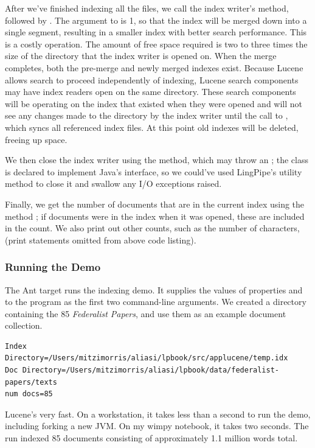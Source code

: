 After we've finished indexing all the files, we call the index
writer's  method, followed by .
The argument to  is 1, so that the index will be merged down
into a single segment, 
resulting in a smaller index with better search performance.  
This is a costly operation.
The amount of free space required is two to three times the size of
the directory that the index writer is opened on.
When the merge completes, both the pre-merge and newly merged indexes exist.
Because Lucene allows search to proceed independently of indexing,
Lucene search components may have index readers open on the same directory.
These search components will be operating on the index that existed when they were opened
and will not see any changes made to the directory by the index writer
until the call to , which syncs all referenced index files.
At this point old indexes will be deleted, freeing up space.

We then close the index
writer using the  method, which may throw an
; the  class is declared to
implement Java's  interface, so we could've used
LingPipe's  utility method to close it
and swallow any I/O exceptions raised.

Finally, we get the number of documents that are in the current index
using the method ; if documents were in the index when
it was opened, these are included in the count.  We also print out 
other counts, such as the number of characters, (print statements omitted
from above code listing).

\subsubsection{Running the Demo}

The Ant target  runs the indexing demo.  It
supplies the values of properties  and 
to the program as the first two command-line arguments.  We created a
directory containing the 85 {\it Federalist Papers}, and use them
as an example document collection.
%
\begin{verbatim}
Index Directory=/Users/mitzimorris/aliasi/lpbook/src/applucene/temp.idx
Doc Directory=/Users/mitzimorris/aliasi/lpbook/data/federalist-papers/texts
num docs=85
\end{verbatim}
%
Lucene's very fast.  On a workstation, it takes less than a second to
run the demo, including forking a new JVM.  On my wimpy notebook,
it takes two seconds. The run indexed 85
documents consisting of approximately 1.1 million words total.

